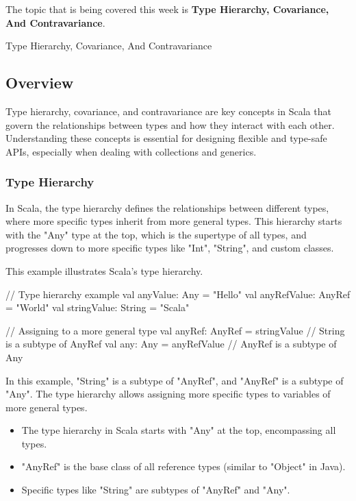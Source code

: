 The topic that is being covered this week is \textbf{Type Hierarchy, Covariance, And Contravariance}.

\begin{notes}{Type Hierarchy, Covariance, And Contravariance}
    \subsection*{Overview}

    Type hierarchy, covariance, and contravariance are key concepts in Scala that govern the relationships between types and how they interact with each other. Understanding these concepts is essential 
    for designing flexible and type-safe APIs, especially when dealing with collections and generics.
    
    \subsubsection*{Type Hierarchy}
    
    In Scala, the type hierarchy defines the relationships between different types, where more specific types inherit from more general types. This hierarchy starts with the "Any" type at the top, which 
    is the supertype of all types, and progresses down to more specific types like "Int", "String", and custom classes.
    
    \begin{highlight}
    
        This example illustrates Scala's type hierarchy.
    
    \begin{code}[Scala]
    // Type hierarchy example
    val anyValue: Any = "Hello"
    val anyRefValue: AnyRef = "World"
    val stringValue: String = "Scala"
    
    // Assigning to a more general type
    val anyRef: AnyRef = stringValue  // String is a subtype of AnyRef
    val any: Any = anyRefValue        // AnyRef is a subtype of Any
    \end{code}
    
        In this example, "String" is a subtype of "AnyRef", and "AnyRef" is a subtype of "Any". The type hierarchy allows assigning more specific types to variables of more general types.
    
        \begin{itemize}
            \item The type hierarchy in Scala starts with "Any" at the top, encompassing all types.
            \item "AnyRef" is the base class of all reference types (similar to "Object" in Java).
            \item Specific types like "String" are subtypes of "AnyRef" and "Any".
        \end{itemize}
    

\end{highlight}
\end{notes}
